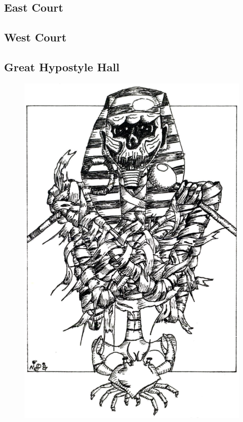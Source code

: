 \documentclass[letterpaper,serif]{rpg-module}
\begin{document}
\begin{boxtext}
\lipsum[3]
\end{boxtext}

\lipsum[4]

\subsection{East Court} %

\lipsum[5]

\subsection{West Court} %

\lipsum[6]

\subsection{Great Hypostyle Hall} %
\label{hypostyle_hall}


\begin{figure}[t]
\includegraphics[width=\columnwidth]{rpg_module_interior_art.png}
\label{img:tomb}
\end{figure}
\end{document}
